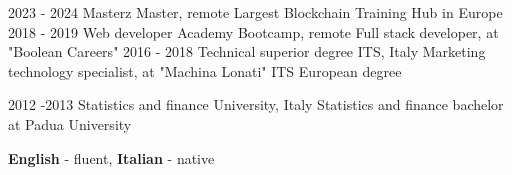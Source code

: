 \documentclass[9pt]{developercv} %
\begin{document}
\vspace{-10 pt}
\begin{entrylist}
     \entry
		{2023 - 2024}
		{Masterz}
		{Master, remote}
		{Largest Blockchain Training Hub in Europe}
   \entry
		{2018 - 2019}
		{Web developer Academy}
		{Bootcamp, remote}
		{Full stack developer, at "Boolean Careers"}
	\entry
		{2016 - 2018}
		{Technical superior degree}
		{ITS, Italy}
		{Marketing technology specialist, at "Machina Lonati" ITS European      degree}
	
  \entry
		{2012 -2013}
		{Statistics and finance}
		{University, Italy}
		{Statistics and finance bachelor at Padua University}

\end{entrylist}



\vspace{-10 pt}
    \vspace{-6pt}
    
    \hspace{26mm} \textbf{English} - fluent, \textbf{ Italian} - native

\end{document}

